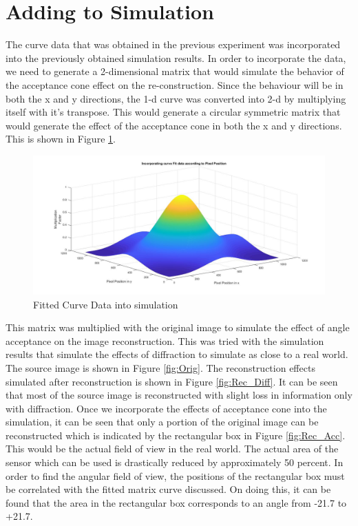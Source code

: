 \section{Adding to Simulation}
The curve data that was obtained in the previous experiment was incorporated into the previously obtained simulation results. In order to incorporate the data, we need to generate a 2-dimensional matrix that would simulate the behavior of the acceptance cone effect on the re-construction. Since the behaviour will be in both the x and y directions, the 1-d curve was converted into 2-d by multiplying itself with it's transpose. This would generate a circular symmetric matrix that would generate the effect of the acceptance cone in both the x and y directions. This is shown in Figure \ref{fig:curve_sim}.
\begin{figure}[!h]
\centering
\includegraphics[width = \linewidth]{pics/AcceptanceConeCurveFit.jpg}
\caption{Fitted Curve Data into simulation}
\label{fig:curve_sim}
\end{figure}
This matrix was multiplied with the original image to simulate the effect of angle acceptance on the image reconstruction. This was tried with the simulation results that simulate the effects of diffraction to simulate as close to a real world. The source image is shown in Figure \ref{fig:Orig}. The reconstruction effects simulated after reconstruction is shown in Figure \ref{fig:Rec_Diff}. It can be seen that most of the source image is reconstructed with slight loss in information only with diffraction. Once we incorporate the effects of acceptance cone into the simulation, it can be seen that only a portion of the original image can be reconstructed which is indicated by the rectangular box in Figure \ref{fig:Rec_Acc}. 
This would be the actual field of view in the real world. The actual area of the sensor which can be used is drastically reduced by approximately 50 percent. In order to find the angular field of view, the positions of the rectangular box must be correlated with the fitted matrix curve discussed. On doing this, it can be found that the area in the rectangular box corresponds to an angle from -21.7 to +21.7.

